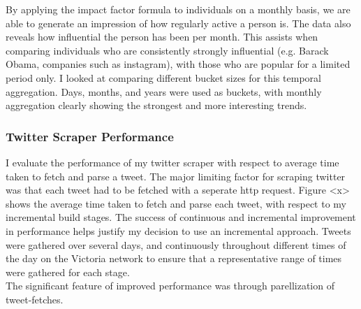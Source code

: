 By applying the impact factor formula to individuals on a monthly basis, we are able to generate an impression of how regularly active a person is. The data also reveals how influential the person has been per month. This assists when comparing individuals who are consistently strongly influential (e.g. Barack Obama, companies such as instagram), with those who are popular for a limited period only. I looked at comparing different bucket sizes for this temporal aggregation. Days, months, and years were used as buckets, with monthly aggregation clearly showing the strongest and more interesting trends. 

\subsubsection{Twitter Scraper Performance}
I evaluate the performance of my twitter scraper with respect to average time taken to fetch and parse a tweet. The major limiting factor for scraping twitter was that each tweet had to be fetched with a seperate http request. Figure <x> shows the average time taken to fetch and parse each tweet, with respect to my incremental build stages. The success of continuous and incremental improvement in performance helps justify my decision to use an incremental approach. Tweets were gathered over several days, and continuously throughout different times of the day on the Victoria network to ensure that a representative range of times were gathered for each stage.\\

\noindent The significant feature of improved performance was through parellization of tweet-fetches. 

